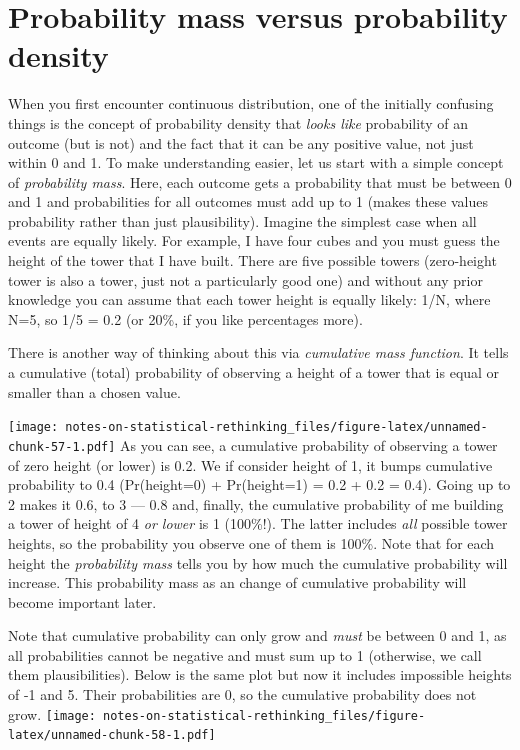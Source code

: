 \documentclass[
]{book}
\begin{document}
\hypertarget{probability-mass-versus-probability-density}{%
\chapter{Probability mass versus probability density}\label{probability-mass-versus-probability-density}}

When you first encounter continuous distribution, one of the initially confusing things is the concept of probability density that \emph{looks like} probability of an outcome (but is not) and the fact that it can be any positive value, not just within 0 and 1. To make understanding easier, let us start with a simple concept of \emph{probability mass}. Here, each outcome gets a probability that must be between 0 and 1 and probabilities for all outcomes must add up to 1 (makes these values probability rather than just plausibility). Imagine the simplest case when all events are equally likely. For example, I have four cubes and you must guess the height of the tower that I have built. There are five possible towers (zero-height tower is also a tower, just not a particularly good one) and without any prior knowledge you can assume that each tower height is equally likely: 1/N, where N=5, so 1/5 = 0.2 (or 20\%, if you like percentages more).

There is another way of thinking about this via \emph{cumulative mass function}. It tells a cumulative (total) probability of observing a height of a tower that is equal or smaller than a chosen value.

\texttt{[image: notes-on-statistical-rethinking\_files/figure-latex/unnamed-chunk-57-1.pdf]}
As you can see, a cumulative probability of observing a tower of zero height (or lower) is 0.2. We if consider height of 1, it bumps cumulative probability to 0.4 (Pr(height=0) + Pr(height=1) = 0.2 + 0.2 = 0.4). Going up to 2 makes it 0.6, to 3 --- 0.8 and, finally, the cumulative probability of me building a tower of height of 4 \emph{or lower} is 1 (100\%!). The latter includes \emph{all} possible tower heights, so the probability you observe one of them is 100\%. Note that for each height the \emph{probability mass} tells you by how much the cumulative probability will increase. This probability mass as an change of cumulative probability will become important later.

Note that cumulative probability can only grow and \emph{must} be between 0 and 1, as all probabilities cannot be negative and must sum up to 1 (otherwise, we call them plausibilities). Below is the same plot but now it includes impossible heights of -1 and 5. Their probabilities are 0, so the cumulative probability does not grow.
\texttt{[image: notes-on-statistical-rethinking\_files/figure-latex/unnamed-chunk-58-1.pdf]}
\end{document}
